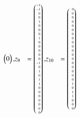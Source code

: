\begin{beispiel}
{\begin{align*}
\begin{pmatrix*}[r]
 0
\end{pmatrix*},
&z_9 %
&=
\tiny
\begin{pmatrix*}[r]
-1\\
-1\\
 0\\
 0\\
 1\\
 0\\
 0\\
 0\\
 1\\
 0\\
 0\\
 0\\
 0\\
 0\\
-1\\
 0\\
 1\\
 0\\
 1\\
 1\\
 0\\
 0\\
 0\\
 0\\
 0\\
 0\\
 0
\end{pmatrix*},
&z_{10} %
&=
\tiny
\begin{pmatrix*}[r]
\phantom{-}
 0\\
 0\\
 0\\
 0\\
 0\\ %
 0\\ 
 0\\
 0\\
 0\\
 0\\ %
 0\\ 
 0\\
 0\\
 0\\
 0\\ %
 0\\
 0\\
 0\\
 1\\
 0\\ %
 1\\
 1\\
 0\\
 0\\
 0\\ %

\end{pmatrix*}
\end{align*}}
\end{beispiel}
